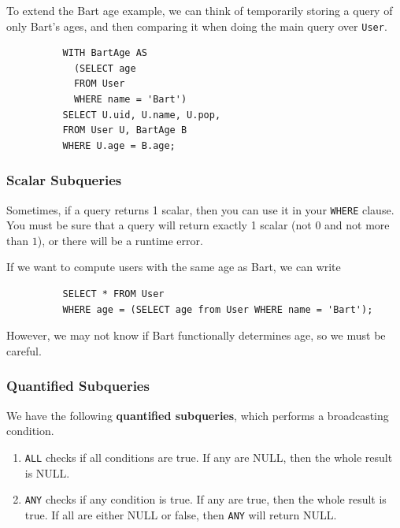 \documentclass{article}
\begin{document}
      \begin{example}
        To extend the Bart age example, we can think of temporarily storing a query of only Bart's ages, and then comparing it when doing the main query over \texttt{User}. 
        \begin{lstlisting}
          WITH BartAge AS 
            (SELECT age 
            FROM User 
            WHERE name = 'Bart') 
          SELECT U.uid, U.name, U.pop, 
          FROM User U, BartAge B 
          WHERE U.age = B.age; 
        \end{lstlisting}
      \end{example}

    \subsubsection{Scalar Subqueries}
      
      \begin{definition}
        Sometimes, if a query returns 1 scalar, then you can use it in your \texttt{WHERE} clause. You must be sure that a query will return exactly 1 scalar (not $0$ and not more than $1$), or there will be a runtime error.  
      \end{definition}

      \begin{example}
        If we want to compute users with the same age as Bart, we can write 
        \begin{lstlisting}
          SELECT * FROM User 
          WHERE age = (SELECT age from User WHERE name = 'Bart'); 
        \end{lstlisting}
        However, we may not know if Bart functionally determines age, so we must be careful. 
      \end{example}

    \subsubsection{Quantified Subqueries}

      \begin{definition}
        We have the following \textbf{quantified subqueries}, which performs a broadcasting condition. 
        \begin{enumerate}
          \item \texttt{ALL} checks if all conditions are true. If any are NULL, then the whole result is NULL. 
          \item \texttt{ANY} checks if any condition is true. If any are true, then the whole result is true. If all are either NULL or false, then \texttt{ANY} will return NULL. 
        \end{enumerate}
      \end{definition}
\end{document}
